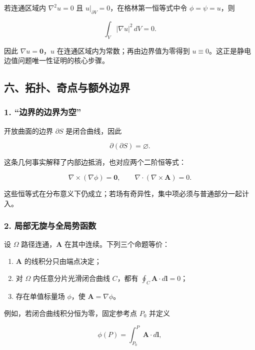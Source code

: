 若连通区域内 \(\nabla^2u=0\) 且
\(u|_{\partial V}=0\)，在格林第一恒等式中令 \(\phi=\psi=u\)，则

\[
\int_V|\nabla u|^2\,dV=0.
\]

因此 \(\nabla u=\mathbf0\)，\(u\) 在连通区域内为常数；再由边界值为零得到
\(u\equiv0\)。这正是静电边值问题唯一性证明的核心步骤。

\subsection{六、拓扑、奇点与额外边界}\label{m1:ux516dux62d3ux6251ux5947ux70b9ux4e0eux989dux5916ux8fb9ux754c}

\subsubsection{1.
``边界的边界为空''}\label{m1:ux8fb9ux754cux7684ux8fb9ux754cux4e3aux7a7a}

开放曲面的边界 \(\partial S\) 是闭合曲线，因此

\[
\partial(\partial S)=\varnothing.
\]

这条几何事实解释了内部边抵消，也对应两个二阶恒等式：

\[
\nabla\times(\nabla\phi)=\mathbf0,
\qquad
\nabla\cdot(\nabla\times\mathbf A)=0.
\]

这些恒等式在分布意义下仍成立；若场有奇异性，集中项必须与普通部分一起计入。

\subsubsection{2.
局部无旋与全局势函数}\label{m1:ux5c40ux90e8ux65e0ux65cbux4e0eux5168ux5c40ux52bfux51fdux6570}

设 \(\Omega\) 路径连通，\(\mathbf A\) 在其中连续。下列三个命题等价：

\begin{enumerate}
\def\labelenumi{\arabic{enumi}.}
\tightlist
\item
  \(\mathbf A\) 的线积分只由端点决定；
\item
  对 \(\Omega\) 内任意分片光滑闭合曲线 \(C\)，都有
  \(\displaystyle\oint_C\mathbf A\cdot d\mathbf l=0\)；
\item
  存在单值标量场 \(\phi\)，使 \(\mathbf A=\nabla\phi\)。
\end{enumerate}

例如，若闭合曲线积分恒为零，固定参考点 \(P_0\) 并定义

\[
\phi(P)
=
\int_{P_0}^{P}\mathbf A\cdot d\mathbf l,
\]

